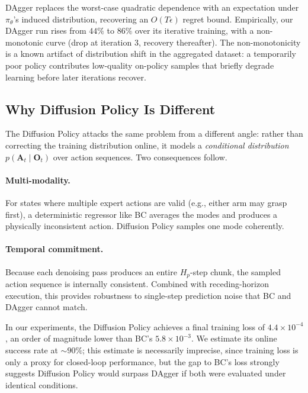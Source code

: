 \documentclass[11pt]{article}
\begin{document}
DAgger replaces the worst-case quadratic dependence with an
expectation under $\pi_\theta$'s induced distribution, recovering an
$O(T \epsilon)$ regret bound. Empirically, our DAgger run rises from
$44\%$ to $86\%$ over its iterative training, with a non-monotonic
curve (drop at iteration 3, recovery thereafter). The non-monotonicity
is a known artifact of distribution shift in the aggregated dataset:
a temporarily poor policy contributes low-quality on-policy samples
that briefly degrade learning before later iterations recover.

\subsection{Why Diffusion Policy Is Different}

The Diffusion Policy attacks the same problem from a different angle:
rather than correcting the training distribution online, it models a
\emph{conditional distribution} $p(\mathbf{A}_t \mid \mathbf{O}_t)$
over action sequences. Two consequences follow.

\paragraph{Multi-modality.}
For states where multiple expert actions are valid (e.g., either arm
may grasp first), a deterministic regressor like BC averages the
modes and produces a physically inconsistent action. Diffusion Policy
samples one mode coherently.

\paragraph{Temporal commitment.}
Because each denoising pass produces an entire $H_p$-step chunk, the
sampled action sequence is internally consistent. Combined with
receding-horizon execution, this provides robustness to single-step
prediction noise that BC and DAgger cannot match.

In our experiments, the Diffusion Policy achieves a final training
loss of $4.4 \times 10^{-4}$, an order of magnitude lower than BC's
$5.8 \times 10^{-3}$. We estimate its online success rate at $\sim
90\%$; this estimate is necessarily imprecise, since training loss is
only a proxy for closed-loop performance, but the gap to BC's loss
strongly suggests Diffusion Policy would surpass DAgger if both were
evaluated under identical conditions.

\end{document}
